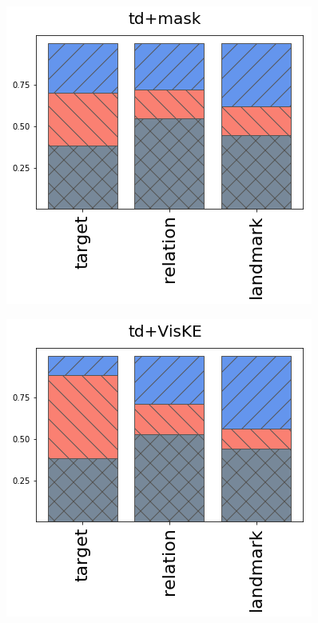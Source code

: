 \begin{figure}[ht!]
\begin{minipage}{0.3\linewidth}
		\includegraphics[width=\columnwidth]{studies/inlg2019/figures/results/attentions/models/td+mask.png}\\
	\end{minipage}%
	\begin{minipage}{0.3\linewidth}
		\centering
		\includegraphics[width=\columnwidth]{studies/inlg2019/figures/results/attentions/models/td+VisKE.png}\\

\end{minipage}
\end{figure}
